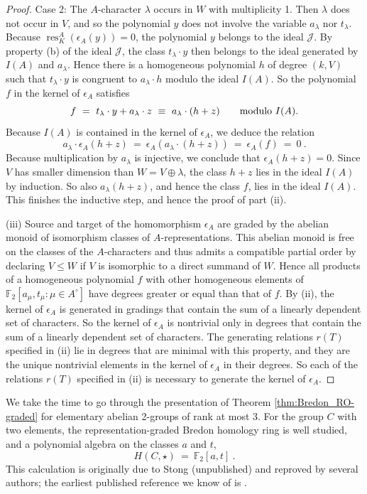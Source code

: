 \documentclass{amsart}[12pt]
\DeclareMathOperator{\res}{res}
\newcommand{\mF}{{\mathbb F}}
\newcommand{\Jc}{{\mathcal J}}
\numberwithin{equation}{section}
\theoremstyle{definition}
\begin{document}
\begin{proof}
  Case 2: The $A$-character $\lambda$ occurs in $W$ with multiplicity 1.
  Then $\lambda$ does not occur in $V$, and so the polynomial $y$
  does not involve the variable $a_\lambda$ nor $t_\lambda$.
  Because $\res^A_K(\epsilon_A(y))=0$, the polynomial $y$ belongs to the ideal $\Jc$.
  By property (b) of the ideal $\Jc$, the class $t_\lambda \cdot y$ then belongs
  to the ideal generated by $I(A)$ and $a_\lambda$.
  Hence there is a homogeneous polynomial $h$ of degree $(k,V)$
  such that $t_\lambda\cdot y$ is congruent to $a_\lambda\cdot h$ modulo the ideal $I(A)$.
  So the polynomial $f$ in the kernel of $\epsilon_A$ satisfies
  \[ f\ = \ t_\lambda\cdot y + a_\lambda\cdot z\ \equiv \ a_\lambda\cdot (h+z)  \text{\qquad modulo $I(A)$.}\]
  Because $I(A)$ is contained in the kernel of $\epsilon_A$, we deduce the relation
  \[ a_\lambda\cdot\epsilon_A(h+z) \ = \  \epsilon_A(a_\lambda\cdot(h+z)) \ = \ \epsilon_A(f) \ = \  0 \ .\]
  Because multiplication by $a_\lambda$ is injective, we conclude that $\epsilon_A(h+z)=0$.
  Since $V$ has smaller dimension than $W=V\oplus \lambda$, the class $h+z$
  lies in the ideal $I(A)$ by induction. So also $a_\lambda(h+z)$, and hence the class $f$,
  lies in the ideal $I(A)$. This finishes the inductive step, and hence the proof of part (ii).

  (iii)
  Source and target of the homomorphism $\epsilon_A$
  are graded by the abelian monoid of isomorphism classes of $A$-representations.
  This abelian monoid is free on the classes of the $A$-characters
  and thus admits a compatible partial order by declaring $V\leq W$
  if $V$ is isomorphic to a direct summand of $W$.
  Hence all products of a homogeneous polynomial $f$ with other homogeneous elements of
  $\mF_2[a_\mu,t_\mu\colon \mu\in A^\circ]$ have degrees greater or equal than that of $f$.
  By (ii), the kernel of $\epsilon_A$ is generated in gradings 
  that contain the sum of a linearly dependent set of characters.
  So the kernel of $\epsilon_A$ is nontrivial only in degrees 
  that contain the sum of a linearly dependent set of characters.
  The generating relations $r(T)$ specified in (ii) lie in degrees
  that are minimal with this property, and they are the unique nontrivial
  elements in the kernel of $\epsilon_A$ in their degrees.
  So each of the relations $r(T)$ specified in (ii) is necessary to generate
  the kernel of $\epsilon_A$.
\end{proof}


We take the time to go through the presentation of
Theorem \ref{thm:Bredon_RO-graded} for elementary abelian 2-groups of rank at most 3.
For the group $C$ with two elements, the representation-graded Bredon homology
ring is well studied, and a polynomial algebra on the classes $a$ and $t$,
\[ H(C,\star)\ = \ \mF_2[a,t]\ . \]
This calculation is originally due to Stong (unpublished)
and reproved by several authors;
the earliest published reference we know of is \cite[Section 2]{lewis:R O_projective}.
\end{document}
